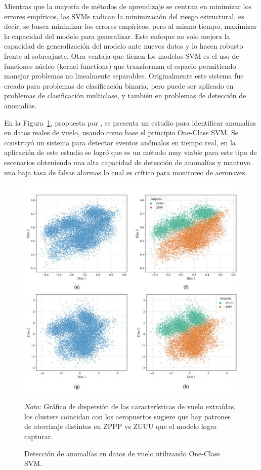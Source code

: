 \documentclass[11pt,a4paper,spanish]{book}
\numberwithin{equation}{chapter}
\numberwithin{figure}{chapter}
\begin{document}
Mientras que la mayoría de métodos de aprendizaje se centran en minimizar los errores 
empíricos, las SVMs radican la minimización del riesgo estructural, es decir, se busca 
minimizar los errores empíricos, pero al mismo tiempo, maximizar la capacidad del modelo 
para generalizar. Este enfoque no solo mejora la capacidad de generalización del modelo 
ante nuevos datos y lo hacen robusto frente al sobreajuste. Otra ventaja que tienen los 
modelos SVM es el uso de funciones núcleo (kernel functions) que transforman el espacio 
permitiendo manejar problemas no linealmente separables. 
Originalmente este sistema fue creado para problemas de clasificación binaria, pero 
puede ser aplicado en problemas de clasificación multiclase, y también en problemas de 
detección de anomalías. 



En la Figura~\ref{fig:figSVMflight}, propuesta por 
\cite{qin2022flight}, se presenta un estudio para identificar anomalías en datos reales 
de vuelo, usando como base el principio One-Class SVM. Se construyó un sistema para 
detectar eventos anómalos en tiempo real, en la aplicación de este estudio se logró que 
es un método muy viable para este tipo de escenarios obteniendo una alta capacidad de 
detección de anomalías y mantuvo una baja tasa de falsas alarmas lo cual es crítico para 
monitoreo de aeronaves.


\begin{figure}[H]
	\caption{Detección de anomalías en datos de vuelo utilizando One-Class SVM. \protect\cite{qin2022flight}}
    \centering
    \includegraphics[width=1.0\textwidth]{media/svm-kun.png}
    \label{fig:figSVMflight}
    \parbox{\textwidth}{\footnotesize \textit{Nota:} Gráfico de dispersión de las 
	características de vuelo extraídas, los clusters coincidan con los aeropuertos sugiere 
	que hay patrones de aterrizaje distintos en ZPPP vs ZUUU que el modelo logra 
	capturar.}
\end{figure}
\end{document}
